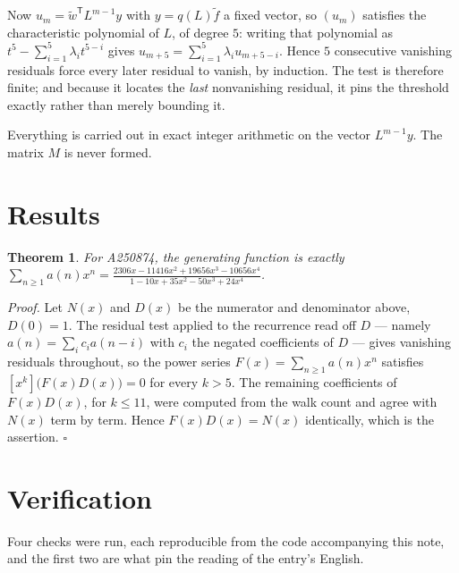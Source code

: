 \documentclass[11pt]{article}
\newtheorem{theorem}{Theorem}
\theoremstyle{definition}
\begin{document}
Now $u_m = \tilde w^{\mathsf T} L^{m-1} y$ with $y = q(L)\tilde f$ a fixed vector, so $(u_m)$ satisfies the characteristic polynomial of $L$, of degree $5$: writing that polynomial as $t^{5} - \sum_{i=1}^{5} \lambda_i t^{5-i}$ gives $u_{m+5} = \sum_{i=1}^{5} \lambda_i u_{m+5-i}$. Hence $5$ consecutive vanishing residuals force every later residual to vanish, by induction. The test is therefore finite; and because it locates the {\itshape last} nonvanishing residual, it pins the threshold exactly rather than merely bounding it.

Everything is carried out in exact integer arithmetic on the vector $L^{m-1}y$. The matrix $M$ is never formed.

\section{Results}

\begin{theorem} For A250874, the generating function is exactly $\sum_{n\ge 1} a(n)x^n = \frac{2306x - 11416x^{2} + 19656x^{3} - 10656x^{4}}{1 - 10x + 35x^{2} - 50x^{3} + 24x^{4}}$.\end{theorem}

{\itshape Proof.} Let $N(x)$ and $D(x)$ be the numerator and denominator above, $D(0)=1$. The residual test applied to the recurrence read off $D$ --- namely $a(n) = \sum_i c_i a(n-i)$ with $c_i$ the negated coefficients of $D$ --- gives vanishing residuals throughout, so the power series $F(x)=\sum_{n\ge 1}a(n)x^n$ satisfies $[x^k]\bigl(F(x)D(x)\bigr) = 0$ for every $k > 5$. The remaining coefficients of $F(x)D(x)$, for $k \le 11$, were computed from the walk count and agree with $N(x)$ term by term. Hence $F(x)D(x) = N(x)$ identically, which is the assertion. $\square$

\section{Verification}

Four checks were run, each reproducible from the code accompanying this note, and the first two are what pin the reading of the entry's English.
\end{document}
